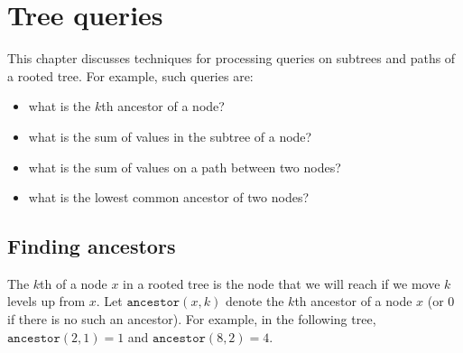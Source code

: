 \chapter{Tree queries}


This chapter discusses techniques for
processing queries on
subtrees and paths of a rooted tree.
For example, such queries are:

\begin{itemize}
\item what is the $k$th ancestor of a node?
\item what is the sum of values in the subtree of a node?
\item what is the sum of values on a path between two nodes?
\item what is the lowest common ancestor of two nodes?
\end{itemize}

\section{Finding ancestors}


The $k$th  of a node $x$ in a rooted tree
is the node that we will reach if we move $k$
levels up from $x$.
Let $\texttt{ancestor}(x,k)$ denote the $k$th ancestor of a node $x$
(or $0$ if there is no such an ancestor).
For example, in the following tree,
$\texttt{ancestor}(2,1)=1$ and $\texttt{ancestor}(8,2)=4$.
\begin{center}
\end{center}


